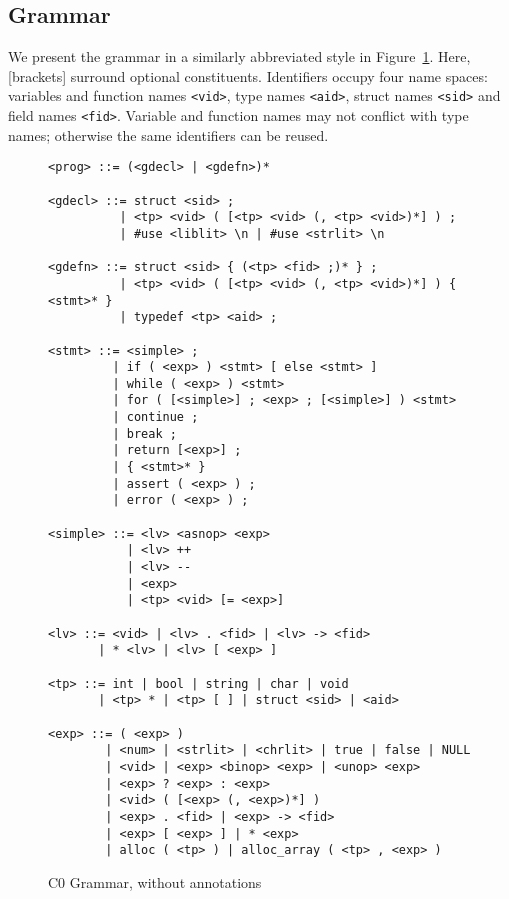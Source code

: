 \documentclass[11pt]{article}
\begin{document}
\subsection{Grammar}

We present the grammar in a similarly abbreviated style in
Figure~\ref{fig:grammar}.  Here, [brackets] surround optional
constituents.  Identifiers occupy four name spaces: variables and
function names \verb'<vid>', type names \verb'<aid>', struct names
\verb'<sid>' and field names \verb'<fid>'.  Variable and function
names may not conflict with type names; otherwise the same identifiers
can be reused.

\begin{figure}
\begin{small}
\begin{verbatim}
<prog> ::= (<gdecl> | <gdefn>)*

<gdecl> ::= struct <sid> ;
          | <tp> <vid> ( [<tp> <vid> (, <tp> <vid>)*] ) ;
          | #use <liblit> \n | #use <strlit> \n

<gdefn> ::= struct <sid> { (<tp> <fid> ;)* } ;
          | <tp> <vid> ( [<tp> <vid> (, <tp> <vid>)*] ) { <stmt>* }
          | typedef <tp> <aid> ;

<stmt> ::= <simple> ;
         | if ( <exp> ) <stmt> [ else <stmt> ]
         | while ( <exp> ) <stmt>
         | for ( [<simple>] ; <exp> ; [<simple>] ) <stmt>
         | continue ;
         | break ;
         | return [<exp>] ;
         | { <stmt>* }
         | assert ( <exp> ) ;
         | error ( <exp> ) ; 

<simple> ::= <lv> <asnop> <exp>
           | <lv> ++
           | <lv> --
           | <exp>
           | <tp> <vid> [= <exp>]

<lv> ::= <vid> | <lv> . <fid> | <lv> -> <fid>
       | * <lv> | <lv> [ <exp> ]

<tp> ::= int | bool | string | char | void
       | <tp> * | <tp> [ ] | struct <sid> | <aid>

<exp> ::= ( <exp> )
        | <num> | <strlit> | <chrlit> | true | false | NULL
        | <vid> | <exp> <binop> <exp> | <unop> <exp>
        | <exp> ? <exp> : <exp>
        | <vid> ( [<exp> (, <exp>)*] )
        | <exp> . <fid> | <exp> -> <fid>
        | <exp> [ <exp> ] | * <exp>
        | alloc ( <tp> ) | alloc_array ( <tp> , <exp> )
\end{verbatim}
\end{small}
\caption{C0 Grammar, without annotations}
\label{fig:grammar}
\end{figure}
\end{document}
